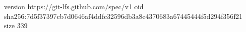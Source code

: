version https://git-lfs.github.com/spec/v1
oid sha256:7d5f37397cb7d0646af4ddfc32596db3a8c4370683a67445444f5d294f356f21
size 339

